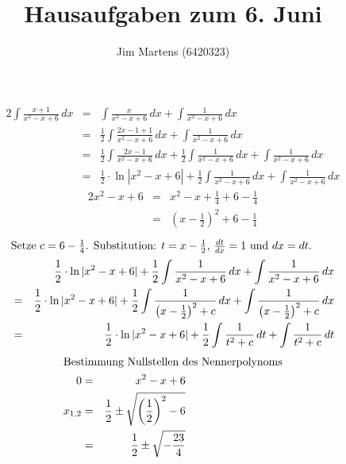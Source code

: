 \documentclass[10pt,a4paper,oneside,ngerman,numbers=noenddot]{scrartcl}
\begin{document}
\author{Jim Martens (6420323)}
\title{Hausaufgaben zum 6. Juni}
\maketitle
\section{} %
\subsubsection{} %
\begin{alignat*}{2}
\int \frac{x + 1}{x^{2} - x +6}\,dx &=& \int \frac{x}{x^{2} - x + 6}\,dx + \int \frac{1}{x^{2} -x + 6}\,dx \\
&=& \frac{1}{2}\int \frac{2x - 1 + 1}{x^{2} - x + 6}\,dx + \int \frac{1}{x^{2} -x + 6}\,dx \\
&=& \frac{1}{2}\int \frac{2x - 1}{x^{2} - x + 6}\,dx + \frac{1}{2}\int \frac{1}{x^{2} - x + 6}\,dx + \int \frac{1}{x^{2} -x + 6}\,dx \\
&=& \frac{1}{2} \cdot \ln |x^{2} - x + 6| + \frac{1}{2}\int \frac{1}{x^{2} - x + 6}\,dx + \int \frac{1}{x^{2} -x + 6}\,dx
\end{alignat*}
\begin{alignat*}{2}
x^{2} - x + 6 &=& x^{2} - x + \frac{1}{4} + 6 - \frac{1}{4} \\
&=& \left( x - \frac{1}{2}\right)^{2} + 6 - \frac{1}{4}
\end{alignat*}
\begin{alignat*}{2}
\intertext{Setze $c = 6 - \frac{1}{4}$. Substitution: $t = x - \frac{1}{2}$, $\frac{dt}{dx} = 1$ und $dx = dt$.}
&& \frac{1}{2} \cdot \ln |x^{2} - x + 6| + \frac{1}{2}\int \frac{1}{x^{2} - x + 6}\,dx + \int \frac{1}{x^{2} -x + 6}\,dx\\
&=& \frac{1}{2} \cdot \ln |x^{2} - x + 6| + \frac{1}{2}\int \frac{1}{\left( x - \frac{1}{2}\right)^{2} + c}\,dx + \int \frac{1}{\left( x - \frac{1}{2}\right)^{2} + c}\,dx \\
&=& \frac{1}{2} \cdot \ln |x^{2} - x + 6| + \frac{1}{2}\int \frac{1}{t^{2} + c}\,dt + \int \frac{1}{t^{2} + c}\,dt
\end{alignat*}
\begin{alignat*}{2}
\intertext{Bestimmung Nullstellen des Nennerpolynoms}
0 &=& x^{2} - x + 6 \\
x_{1,2} &=& \frac{1}{2} \pm \sqrt{\left(\frac{1}{2}\right)^{2} - 6} \\
&=& \frac{1}{2} \pm \sqrt{- \frac{23}{4}}
\end{alignat*}
\end{document}
